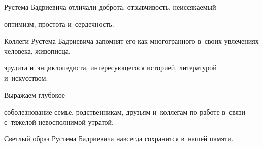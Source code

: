      


     \thispagestyle{empty}


     


     Рустема Бадриевича отличали доброта, отзывчивость, неиссякаемый


      оптимизм, простота и~сердечность.


     


     Коллеги Рустема Бадриевича запомнят его как многогранного в~своих увлечениях человека, живописца,


     эрудита и~энциклопедиста, интересующегося историей, литературой и~искусством.


     


     Выражаем глубокое


     соболезнование семье, родственникам, друзьям и~коллегам по работе в~связи с~тяжелой невосполнимой утратой.


     Светлый образ Рустема Бадриевича навсегда сохранится в~нашей памяти.


     





      


